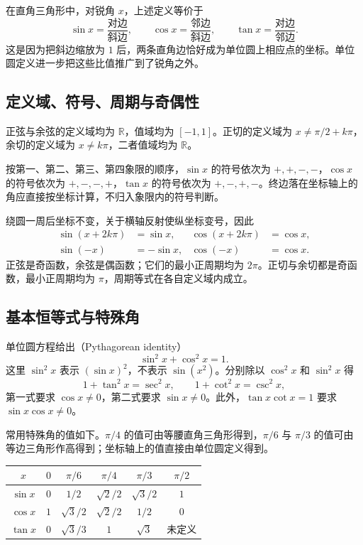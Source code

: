 \documentclass[UTF8]{ctexart}
\begin{document}
在直角三角形中，对锐角 $x$，上述定义等价于
\[
  \sin x=\frac{\text{对边}}{\text{斜边}},\qquad
  \cos x=\frac{\text{邻边}}{\text{斜边}},\qquad
  \tan x=\frac{\text{对边}}{\text{邻边}}.
\]
这是因为把斜边缩放为 $1$ 后，两条直角边恰好成为单位圆上相应点的坐标。单位圆定义进一步把这些比值推广到了锐角之外。

\subsection{定义域、符号、周期与奇偶性}

正弦与余弦的定义域均为 $\mathbb R$，值域均为 $[-1,1]$。正切的定义域为 $x\ne\pi/2+k\pi$，余切的定义域为 $x\ne k\pi$，二者值域均为 $\mathbb R$。

按第一、第二、第三、第四象限的顺序，$\sin x$ 的符号依次为 $+,+,-,-$，$\cos x$ 的符号依次为 $+,-,-,+$，$\tan x$ 的符号依次为 $+,-,+,-$。终边落在坐标轴上的角应直接按坐标计算，不归入象限内的符号判断。

绕圆一周后坐标不变，关于横轴反射使纵坐标变号，因此
\begin{align}
  \sin(x+2k\pi)&=\sin x,&\cos(x+2k\pi)&=\cos x,
  \label{eq:trig-period}\\
  \sin(-x)&=-\sin x,&\cos(-x)&=\cos x.
  \label{eq:trig-parity}
\end{align}
正弦是奇函数，余弦是偶函数；它们的最小正周期均为 $2\pi$。正切与余切都是奇函数，最小正周期均为 $\pi$，周期等式在各自定义域内成立。

\subsection{基本恒等式与特殊角}

单位圆方程给出（Pythagorean identity）
\begin{equation}\label{eq:trig-pythagorean}
  \boxed{\sin^2x+\cos^2x=1}.
\end{equation}
这里 $\sin^2x$ 表示 $(\sin x)^2$，不表示 $\sin(x^2)$。分别除以 $\cos^2x$ 和 $\sin^2x$ 得
\begin{equation}\label{eq:trig-sec-csc}
  1+\tan^2x=\sec^2x,\qquad
  1+\cot^2x=\csc^2x,
\end{equation}
第一式要求 $\cos x\ne0$，第二式要求 $\sin x\ne0$。此外，$\tan x\cot x=1$ 要求 $\sin x\cos x\ne0$。

常用特殊角的值如下。$\pi/4$ 的值可由等腰直角三角形得到，$\pi/6$ 与 $\pi/3$ 的值可由等边三角形作高得到；坐标轴上的值直接由单位圆定义得到。
\begin{center}
\begin{tabular}{c c c c c c}
\toprule
$x$ & $0$ & $\pi/6$ & $\pi/4$ & $\pi/3$ & $\pi/2$ \\
\midrule
$\sin x$ & $0$ & $1/2$ & $\sqrt2/2$ & $\sqrt3/2$ & $1$ \\
$\cos x$ & $1$ & $\sqrt3/2$ & $\sqrt2/2$ & $1/2$ & $0$ \\
$\tan x$ & $0$ & $\sqrt3/3$ & $1$ & $\sqrt3$ & 未定义 \\
\bottomrule
\end{tabular}
\end{center}
\end{document}
